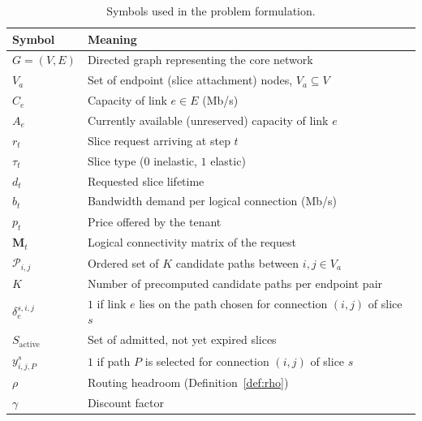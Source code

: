 \documentclass[10pt,journal,comsoc]{IEEEtran}
\begin{document}
\begin{table}[t]
\centering
\caption{Symbols used in the problem formulation.}
\label{tab:problem_symbols}
\renewcommand{\arraystretch}{1.15}
\begin{tabular}{>{\raggedright\arraybackslash}p{1.4cm} >{\raggedright\arraybackslash}p{6.5cm}}
\toprule
\textbf{Symbol} & \textbf{Meaning} \\
\midrule
$G=(V,E)$ & Directed graph representing the core network \\
$V_a$ & Set of endpoint (slice attachment) nodes, $V_a \subseteq V$ \\
$C_e$ & Capacity of link $e \in E$ (Mb/s) \\
$A_e$ & Currently available (unreserved) capacity of link $e$ \\
$r_t$ & Slice request arriving at step $t$ \\
$\tau_t$ & Slice type ($0$ inelastic, $1$ elastic) \\
$d_t$ & Requested slice lifetime \\
$b_t$ & Bandwidth demand per logical connection (Mb/s) \\
$p_t$ & Price offered by the tenant \\
$\mathbf{M}_t$ & Logical connectivity matrix of the request \\
$\mathcal{P}_{i,j}$ & Ordered set of $K$ candidate paths between $i,j \in V_a$ \\
$K$ & Number of precomputed candidate paths per endpoint pair \\
$\delta^{s,i,j}_e$ & $1$ if link $e$ lies on the path chosen for connection $(i,j)$ of slice $s$ \\
$S_{\text{active}}$ & Set of admitted, not yet expired slices \\
$y^{s}_{i,j,P}$ & $1$ if path $P$ is selected for connection $(i,j)$ of slice $s$ \\
$\rho$ & Routing headroom (Definition~\ref{def:rho}) \\
$\gamma$ & Discount factor \\
\bottomrule
\end{tabular}
\end{table}
\end{document}
